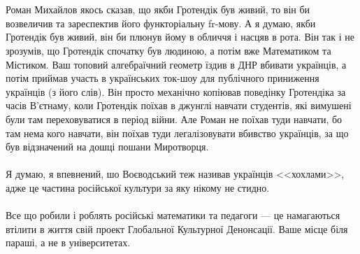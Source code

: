 \\
\\
Роман Михайлов якось сказав, що якби Гротендік був живий, то він би возвеличив та зареспектив його функторіальну fr-мову. А я думаю, якби Гротендік був живий, він би плюнув йому в обличчя і насцяв в рота. Він так і не зрозумів, що Гротендік спочатку був людиною, а потім вже Математиком та Містиком. Ваш топовий алгебраїчний геометр їздив в ДНР вбивати українців, а потім приймав участь в українських ток-шоу для публічного приниження українців (з його слів). Він просто механічно копіював поведінку Гротендіка за часів В'єтнаму, коли Гротендік поїхав в джунглі навчати студентів, які вимушені були там переховуватися в період війни. Але Роман не поїхав туди навчати, бо там нема кого навчати, він поїхав туди легалізовувати вбивство українців, за що був відзначений на дошці пошани Миротворця.
\\
\\
Я думаю, я впевнений, шо Воєводський теж називав українців <<хохлами>>, адже це частина російської культури за яку нікому не стидно.
\\
\\
Все що робили і роблять російські математики та педагоги — це намагаються втілити в життя свій проект Глобальної Культурної Денонсації. Ваше місце біля параші, а не в університетах.

\normalsize
